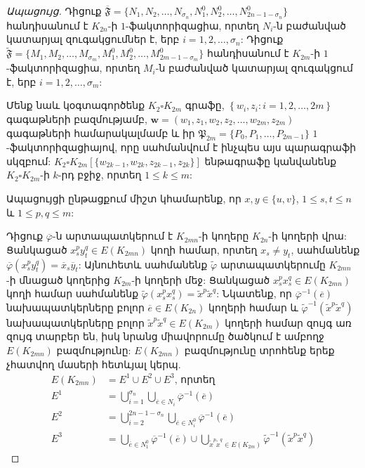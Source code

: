 \begin{proof}[Ապացույց]
Դիցուք $\overline{\mathfrak{F}} = \{ N_1,N_2,\ldots,N_{\sigma_n},N^0_1,N^0_2,\ldots, N^0_{2n-1-\sigma_n} \}$ հանդիսանում է $K_{2n}$-ի $1$-ֆակտորիզացիա, որտեղ $N_i$-ն բաժանված կատարյալ զուգակցումներ է, երբ $i=1,2,\ldots,\sigma_n$: Դիցուք $\widetilde{\mathfrak{F}} = \{ M_1,M_2,\ldots,M_{\sigma_m},M^0_1,M^0_2,\ldots, M^0_{2m-1-\sigma_m} \}$ հանդիսանում է $K_{2m}$-ի $1$-ֆակտորիզացիա, որտեղ $M_i$-ն բաժանված կատարյալ զուգակցում է, երբ $i=1,2,\ldots,\sigma_m$: 

Մենք նաև կօգտագործենք $K_2 \square K_{2m}$ գրաֆը, $\left\{w_i,z_i : i=1,2,\ldots,2m\right\}$ գագաթների բազմությամբ, $\mathbf{w} = \left( w_1,z_1,w_2,z_2,\ldots,w_{2m},z_{2m} \right)$ գագաթների համարակալմամբ և իր $\mathfrak{P}_{2m} = \{P_0,P_1,\ldots,P_{2m-1} \}$ $1$-ֆակտորիզացիայով, որը սահմանվում է ինչպես այս պարագրաֆի սկզբում: $K_2 \square K_{2m}[\{w_{2k-1},w_{2k},z_{2k-1},z_{2k}\}]$ ենթագրաֆը կանվանենք $K_2 \square K_{2m}$-ի $k$-րդ բջիջ, որտեղ $1 \leq k \leq m$:

Ապացույցի ընթացքում միշտ կհամարենք, որ $x,y \in \{u,v\}$, $1 \leq s,t \leq n$ և $1 \leq p,q \leq m$:

Դիցուք $\overline{\varphi}$-ն արտապատկերում է $K_{2mn}$-ի կողերը $K_{2n}$-ի կողերի վրա: Ցանկացած $x^p_sy^q_t \in E(K_{2mn})$ կողի համար, որտեղ $x_s \neq y_t$, սահմանենք $\overline{\varphi}(x^p_sy^q_t)=\overline{x}_s\overline{y}_t$: Այնուհետև սահմանենք $\widetilde{\varphi}$ արտապատկերումը $K_{2mn}$-ի մնացած կողերից $K_{2m}$-ի կողերի մեջ: Ցանկացած $x^p_sx^q_s \in E(K_{2mn})$ կողի համար սահմանենք $\widetilde{\varphi}( x^p_sx^q_s ) = \widetilde{x}^p\widetilde{x}^q$: Նկատենք, որ $\overline{\varphi}^{-1}(\overline{e})$ նախապատկերները բոլոր $\overline{e} \in E(K_{2n})$ կողերի համար և $\widetilde{\varphi}^{-1}(\widetilde{x}^p\widetilde{x}^q)$ նախապատկերները բոլոր $\widetilde{x}^p\widetilde{x}^q \in E(K_{2m})$ կողերի համար զույգ առ զույգ տարբեր են, իսկ նրանց միավորումը ծածկում է ամբողջ $E(K_{2mn})$ բազմությունը: $E(K_{2mn})$ բազմությունը տրոհենք երեք չհատվող մասերի հետևյալ կերպ.
\begin{align*}
E(K_{2mn}) &= E^1 \cup E^2 \cup E^3 \text{, որտեղ} \\
E^1 &= \bigcup\limits_{i=1}^{\sigma_n}{\bigcup\limits_{\overline{e} \in N_i}{\overline{\varphi}^{-1}(\overline{e})}} \\
E^2 &= \bigcup\limits_{i=2}^{2n-1-\sigma_n}\bigcup\limits_{\overline{e} \in N^0_i}{\overline{\varphi}^{-1}(\overline{e})} \\
E^3 &= \bigcup\limits_{\overline{e} \in N^0_1}{\overline{\varphi}^{-1}(\overline{e})} \cup \bigcup\limits_{\widetilde{x}^p\widetilde{x}^q \in E(K_{2m})}{\widetilde{\varphi}^{-1}(\widetilde{x}^p\widetilde{x}^q)}
\end{align*}


\end{proof}
